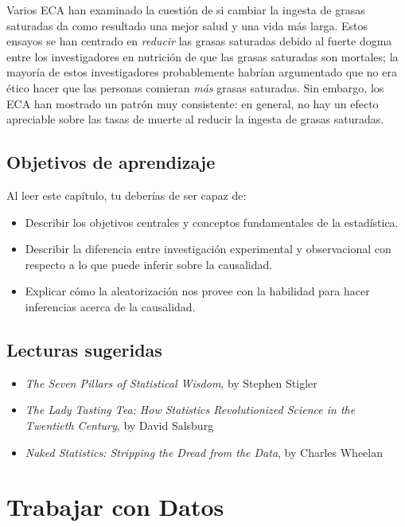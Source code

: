 \documentclass[
  12pt,
]{book}
\providecommand{\tightlist}{%
  \setlength{\itemsep}{0pt}\setlength{\parskip}{0pt}}
\begin{document}
Varios ECA han examinado la cuestión de si cambiar la ingesta de grasas saturadas da como resultado una mejor salud y una vida más larga. Estos ensayos se han centrado en \emph{reducir} las grasas saturadas debido al fuerte dogma entre los investigadores en nutrición de que las grasas saturadas son mortales; la mayoría de estos investigadores probablemente habrían argumentado que no era ético hacer que las personas comieran \emph{más} grasas saturadas. Sin embargo, los ECA han mostrado un patrón muy consistente: en general, no hay un efecto apreciable sobre las tasas de muerte al reducir la ingesta de grasas saturadas.

\hypertarget{objetivos-de-aprendizaje}{%
\section{Objetivos de aprendizaje}\label{objetivos-de-aprendizaje}}

Al leer este capítulo, tu deberías de ser capaz de:

\begin{itemize}
\tightlist
\item
  Describir los objetivos centrales y conceptos fundamentales de la estadística.
\item
  Describir la diferencia entre investigación experimental y observacional con respecto a lo que puede inferir sobre la causalidad.
\item
  Explicar cómo la aleatorización nos provee con la habilidad para hacer inferencias acerca de la causalidad.
\end{itemize}

\hypertarget{lecturas-sugeridas}{%
\section{Lecturas sugeridas}\label{lecturas-sugeridas}}

\begin{itemize}
\tightlist
\item
  \emph{The Seven Pillars of Statistical Wisdom}, by Stephen Stigler
\item
  \emph{The Lady Tasting Tea: How Statistics Revolutionized Science in the Twentieth Century}, by David Salsburg
\item
  \emph{Naked Statistics: Stripping the Dread from the Data}, by Charles Wheelan
\end{itemize}

\hypertarget{trabajar-con-datos}{%
\chapter{Trabajar con Datos}\label{trabajar-con-datos}}
\end{document}
